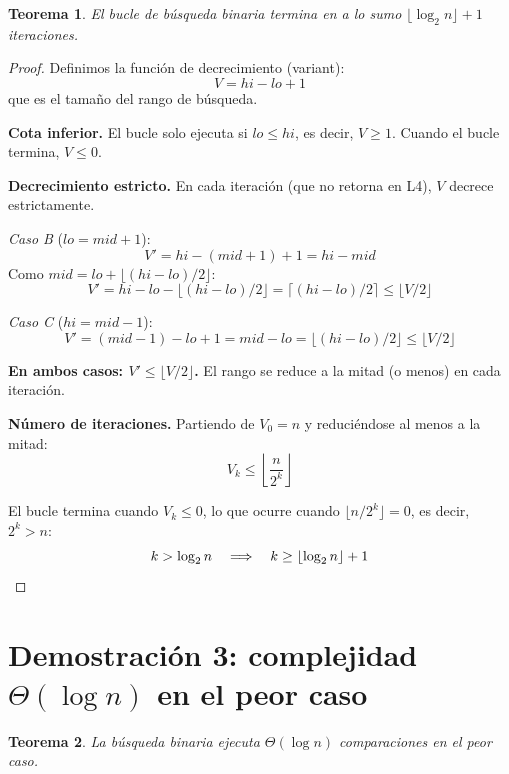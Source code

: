 \documentclass[11pt, letterpaper]{article}
\theoremstyle{definition}
\theoremstyle{plain}
\newtheorem{theorem}{Teorema}[section]
\theoremstyle{remark}
\begin{document}
\begin{theorem}\label{thm:termination}
El bucle de búsqueda binaria termina en a lo sumo
$\lfloor \log_2 n \rfloor + 1$ iteraciones.
\end{theorem}

\begin{proof}
Definimos la función de decrecimiento (variant):
\[
  V = \mathit{hi} - \mathit{lo} + 1
\]
que es el tamaño del rango de búsqueda.

\textbf{Cota inferior.} El bucle solo ejecuta si
$\mathit{lo} \leq \mathit{hi}$, es decir, $V \geq 1$. Cuando el
bucle termina, $V \leq 0$.

\textbf{Decrecimiento estricto.} En cada iteración (que no retorna
en L4), $V$ decrece estrictamente.

\emph{Caso B} ($\mathit{lo} = \mathit{mid} + 1$):
\[
  V' = \mathit{hi} - (\mathit{mid} + 1) + 1
     = \mathit{hi} - \mathit{mid}
\]
Como $\mathit{mid} = \mathit{lo} +
\lfloor(\mathit{hi}{-}\mathit{lo})/2\rfloor$:
\[
  V' = \mathit{hi} - \mathit{lo}
     - \lfloor(\mathit{hi}{-}\mathit{lo})/2\rfloor
     = \lceil(\mathit{hi}{-}\mathit{lo})/2\rceil
     \leq \lfloor V/2 \rfloor
\]

\emph{Caso C} ($\mathit{hi} = \mathit{mid} - 1$):
\[
  V' = (\mathit{mid} - 1) - \mathit{lo} + 1
     = \mathit{mid} - \mathit{lo}
     = \lfloor(\mathit{hi}{-}\mathit{lo})/2\rfloor
     \leq \lfloor V/2 \rfloor
\]

\textbf{En ambos casos: $V' \leq \lfloor V/2 \rfloor$.} El rango se
reduce a la mitad (o menos) en cada iteración.

\textbf{Número de iteraciones.} Partiendo de $V_0 = n$ y reduciéndose
al menos a la mitad:
\[
  V_k \leq \left\lfloor \frac{n}{2^k} \right\rfloor
\]

El bucle termina cuando $V_k \leq 0$, lo que ocurre cuando
$\lfloor n/2^k \rfloor = 0$, es decir, $2^k > n$:
\[
  k > \log_2 n
  \quad\Longrightarrow\quad
  k \geq \lfloor \log_2 n \rfloor + 1 \qedhere
\]
\end{proof}

\section{Demostración 3: complejidad
  \texorpdfstring{$\Theta(\log n)$}{Theta(log n)} en el peor caso}

\begin{theorem}\label{thm:complexity}
La búsqueda binaria ejecuta $\Theta(\log n)$ comparaciones en el peor
caso.
\end{theorem}
\end{document}
